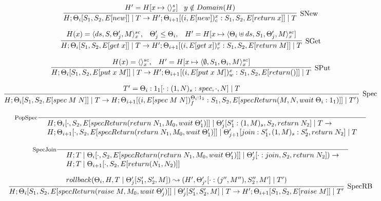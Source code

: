 \documentclass[9pt]{article}
\newcommand{\eval}[1]{E[#1]}
\begin{document}
\[%
\infer[\text{SNew}]{H; \Theta_i[S_1, S_2, \eval{new}] \; | \; T \rightarrow H';  \Theta_{i+1}[(i, \eval{new})_c^x : S_1, S_2, \eval{return \; x}] \; | \; T}{H' = H[x \mapsto \langle\rangle_x^s] \;\;\; y \notin Domain(H)}
\]

\[%
\infer[\text{SGet}]{H; \Theta_i[S_1, S_2, \eval{get \; x}] \; | \; T \rightarrow H'; \Theta_{i+1}[(i, \eval{get \; x})_r^x : S_1, S_2, \eval{return \; M}] \; | \; T}{H(x) = \langle ds, S, \Theta_j', M\rangle_x^{sc}, \;\;\; \Theta_j' \le \Theta_i, \;\;\; H' = H[x \mapsto \langle \Theta_i \uplus ds, S_1, \Theta_j', M\rangle_x^{sc}]}
\]

\[%
\infer[\text{SPut}]{H; \Theta_i[S_1, S_2, \eval{put \; x \; M}] \; | \; T \rightarrow H'; \Theta_{i+1}[(i, \eval{put \; x \; M})_w^x : S_1, S_2, \eval{return()}] \; | \; T}{H(x) = \langle\rangle_x^{sc}, \;\;\; H' = H[x \mapsto \langle \emptyset, S_1, \Theta_i, M\rangle_x^{sc}]}
\]

\[ %
\infer[\text{Spec}]{H; \Theta_i[S_1, S_2, \eval{spec \; M \; N}] \; | \; T \rightarrow H; \Theta_{i+1}[(i, \eval{spec \; M \; N})_f^{\Theta_i : 1_1} : S_1, S_2, \eval{specReturn(M, N, wait \; \Theta_i : 1_1)}] \; | \; T')}{T' = \Theta_i : 1_1[\cdot : (1, N)_s : spec, \cdot, N] \; | \; T}
\]

\[%
\inference[\text{PopSpec}]{}{\begin{array}{l} H; \Theta_i[\cdot, S_2, \eval{specReturn(return \; N_1, M_0, wait \; \Theta_1')}]  \; | \; \Theta_j'[S_1' : (1, M)_s, S_2, return \; N_2] \; | \; T \rightarrow \\ H; \Theta_{i+1}[\cdot, S_2, \eval{specReturn(return \; N_1, M_0, wait \; \Theta_1')}] \; | \; \Theta_{j+1}'[join : S_1', (1, M)_s : S_2', return \; N_2] \; | \; T \end{array}}
\]

\[%
\inference[\text{SpecJoin}]{}{\begin{array}{l} H; T \; | \; \Theta_i[\cdot, S_2, \eval{specReturn(return \; N_1, M_0, wait \; \Theta_1')}] \; | \; \Theta_j'[\cdot : join, S_2, return \; N_2]) \rightarrow \\ H; T \; | \; \Theta_{i+1}[\cdot, S_2, \eval{return(N_1, N_2)}] \end{array}}
\]

\[%
\infer[\text{SpecRB}]{H; \Theta_i[S_1, S_2, \eval{specReturn(raise \; M, M_0, wait \; \Theta_j')}] \; | \; \Theta_j'[S_1', S_2', M] \; | \; T \rightarrow H'; \Theta_{i+1}[S_1, S_2, \eval{raise \; M}] \; | \; T'}{rollback(\Theta_i, H, T \; | \; \Theta_j'[S_1', S_2', M]) \leadsto (H', \Theta_{j'}'[\cdot : (j'', M''), S_2'', M'] \; | \; T')}
\]
\end{document}
